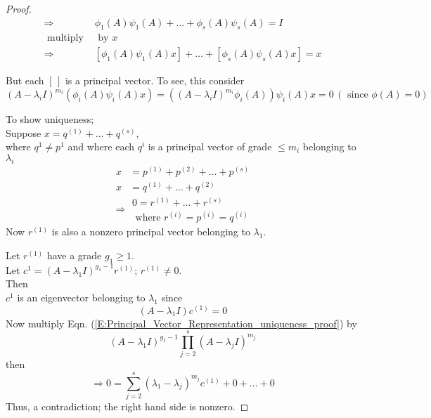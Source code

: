 \documentclass[twoside]{amsart}
\theoremstyle{plain}
\theoremstyle{definition}
\begin{document}
\begin{proof}
\begin{align*}
  \Longrightarrow & \phi_1(A) \psi_1(A) + \dots + \phi_s(A) \psi_s(A) = I \\
  \text{ multiply } & \text{ by $x$ } \\
  \Longrightarrow & [ \phi_1(A) \psi_1(A) x] + \dots + [\phi_s(A) \psi_s(A)x] = x
\end{align*}

But each $[ \, ]$ is a principal vector.  To see, this consider 
\[
(A-\lambda_i I)^{m_i} (\phi_i(A) \psi_i(A) x) = ((A-\lambda_i I)^{m_i} \phi_i(A)) \psi_i(A) x = 0 \, (\text{ since } \phi(A) = 0)
\]

To show uniqueness; \\
\phantom{To} Suppose $x = q^{(1)} + \dots + q^{(s)} $, \\
\phantom{to S} where $q^1 \neq p^1$ and where each $q^i$ is a principal vector of grade $\leq m_i$ belonging to $\lambda_i$
\[
\begin{aligned}
  x & = p^{(1)} + p^{(2)} + \dots + p^{(s)} \\
  x & = q^{(1)} + \dots + q^{(2)} 
\end{aligned}
\]
\begin{equation}\label{E:Principal_Vector_Representation_uniqueness_proof}
 \Longrightarrow 
\begin{gathered}
  0 = r^{(1)} + \dots + r^{(s)} \\
  \text{ where } r^{(i)} = p^{(i)} = q^{(i)} 
\end{gathered}
\end{equation}
Now $r^{(1)}$ is also a nonzero principal vector belonging to $\lambda_1$.  

Let $r^{(1)}$ have a grade $g_1 \geq 1$.  \\
Let $c^1 = (A- \lambda_1 I)^{g_1-1}r^{(1)}; \, r^{(1)} \neq 0 $.  \\
\phantom{Let} Then \\
\phantom{Let The} $c^1$ is an eigenvector belonging to $\lambda_1$ since 
\[
(A-\lambda_1 I)c^{(1)} = 0
\]
Now multiply Eqn. (\ref{E:Principal_Vector_Representation_uniqueness_proof}) by 
\[
(A -\lambda_1 I)^{g_1 -1} \prod_{j=2}^s (A-\lambda_j I)^{m_j}
\]
then
\[
\Longrightarrow 0 = \sum_{j=2}^s (\lambda_1 - \lambda_j)^{m_j} c^{(1)} + 0 + \dots + 0
\]
Thus, a contradiction; the right hand side is nonzero.  


\end{proof}
\end{document}
